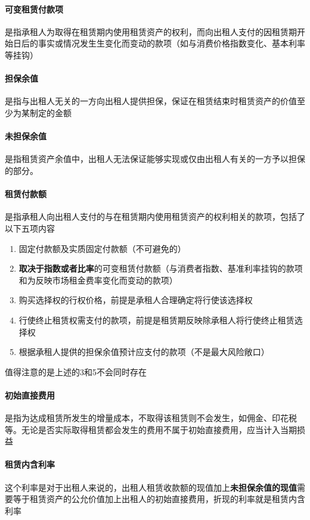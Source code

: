 \documentclass[UTF8,12pt]{ctexart}
\numberwithin{equation}{section} %
\numberwithin{figure}{section}
\numberwithin{table}{section}
\begin{document}
	\paragraph{可变租赁付款项}是指承租人为取得在租赁期内使用租赁资产的权利，而向出租人支付的因租赁期开始日后的事实或情况发生生变化而变动的款项（如与消费价格指数变化、基本利率等挂钩）
	
	\paragraph{担保余值}是指与出租人无关的一方向出租人提供担保，保证在租赁结束时租赁资产的价值至少为某制定的金额
	
	\paragraph{未担保余值}是指租赁资产余值中，出租人无法保证能够实现或仅由出租人有关的一方予以担保的部分。
	
	\paragraph{租赁付款额}是指承租人向出租人支付的与在租赁期内使用租赁资产的权利相关的款项，包括了以下五项内容
	\begin{enumerate}
		\item 固定付款额及实质固定付款额（不可避免的）
		
		\item \textbf{取决于指数或者比率}的可变租赁付款额（与消费者指数、基准利率挂钩的款项和为反映市场租金费率变化而变动的款项）
		
		\item 购买选择权的行权价格，前提是承租人合理确定将行使该选择权
		
		\item 行使终止租赁权需支付的款项，前提是租赁期反映除承租人将行使终止租赁选择权
		
		\item 根据承租人提供的担保余值预计应支付的款项（不是最大风险敞口）
	\end{enumerate}
	值得注意的是上述的3和5不会同时存在
	
	\paragraph{初始直接费用}是指为达成租赁所发生的增量成本，不取得该租赁则不会发生，如佣金、印花税等。无论是否实际取得租赁都会发生的费用不属于初始直接费用，应当计入当期损益
	
	\paragraph{租赁内含利率}这个利率是对于出租人来说的，出租人租赁收款额的现值加上\textbf{未担保余值的现值}需要等于租赁资产的公允价值加上出租人的初始直接费用，折现的利率就是租赁内含利率
	
\end{document}
